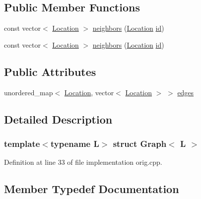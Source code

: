 \subsection*{Public Member Functions}
\begin{DoxyCompactItemize}
\item 
const vector$<$ \mbox{\hyperlink{struct_graph_aea7d42bb67163fe692353674435a1426}{Location}} $>$ \mbox{\hyperlink{struct_graph_a8389c308ee673e63d574e0a30191662e}{neighbors}} (\mbox{\hyperlink{struct_graph_aea7d42bb67163fe692353674435a1426}{Location}} \mbox{\hyperlink{glad_8h_a58c2a664503e14ffb8f21012aabff3e9}{id}})
\item 
const vector$<$ \mbox{\hyperlink{struct_graph_aea7d42bb67163fe692353674435a1426}{Location}} $>$ \mbox{\hyperlink{struct_graph_a8389c308ee673e63d574e0a30191662e}{neighbors}} (\mbox{\hyperlink{struct_graph_aea7d42bb67163fe692353674435a1426}{Location}} \mbox{\hyperlink{glad_8h_a58c2a664503e14ffb8f21012aabff3e9}{id}})
\end{DoxyCompactItemize}
\subsection*{Public Attributes}
\begin{DoxyCompactItemize}
\item 
unordered\+\_\+map$<$ \mbox{\hyperlink{struct_graph_aea7d42bb67163fe692353674435a1426}{Location}}, vector$<$ \mbox{\hyperlink{struct_graph_aea7d42bb67163fe692353674435a1426}{Location}} $>$ $>$ \mbox{\hyperlink{struct_graph_a8b01818e086835dc5d24ec4082afeef0}{edges}}
\end{DoxyCompactItemize}


\subsection{Detailed Description}
\subsubsection*{template$<$typename L$>$\newline
struct Graph$<$ L $>$}



Definition at line 33 of file implementation orig.\+cpp.



\subsection{Member Typedef Documentation}
\mbox{\label{struct_graph_af43d6412d7a6034eaeacde8ca1c1d984}} 
